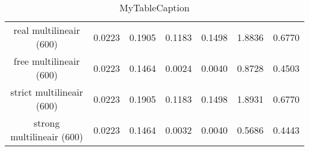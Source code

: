 \begin{table}
\centering
\begin{tabular}{|c|c|c|c|c|c|c|}
\hline
 &  &  &  &  &  &  \\
\hline
real multilineair (600) & 0.0223 & 0.1905 & 0.1183 & 0.1498 & 1.8836 & 0.6770 \\
\hline
free multilineair (600) & 0.0223 & 0.1464 & 0.0024 & 0.0040 & 0.8728 & 0.4503 \\
\hline
strict multilineair (600) & 0.0223 & 0.1905 & 0.1183 & 0.1498 & 1.8931 & 0.6770 \\
\hline
strong multilineair (600) & 0.0223 & 0.1464 & 0.0032 & 0.0040 & 0.5686 & 0.4443 \\
\hline
\end{tabular}
\caption{MyTableCaption}
\label{table:MyTableLabel}
\end{table}
